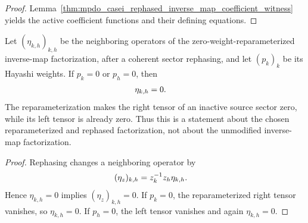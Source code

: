 \begin{proof}
    \leanok
    Lemma~\ref{thm:mpdo_casei_rephased_inverse_map_coefficient_witness}
    yields the active coefficient functions and their defining equations.
\end{proof}

\begin{lemma}
    \label{thm:mpdo_rephased_zero_weight_incident_vanish}
    \leanok
    Let $(\eta_{k,h})_{k,h}$ be the neighboring operators of the
    zero-weight-reparameterized inverse-map factorization, after a coherent
    sector rephasing, and let $(p_k)_k$ be its Hayashi weights. If
    $p_k=0$ or $p_h=0$, then
    \begin{align}
        \eta_{k,h} & =0.
        \notag
    \end{align}
    The reparameterization makes the right tensor of an inactive source sector
    zero, while its left tensor is already zero. Thus this is a statement about
    the chosen reparameterized and rephased factorization, not about the unmodified
    inverse-map factorization.
\end{lemma}

\begin{proof}
    \leanok
    Rephasing changes a neighboring operator by
    \begin{align}
        (\eta_z)_{k,h} & =z_k^{-1}z_h\eta_{k,h}.
        \notag
    \end{align}
    Hence \(\eta_{k,h}=0\) implies \((\eta_z)_{k,h}=0\). If \(p_k=0\),
    the reparameterized right tensor vanishes, so \(\eta_{k,h}=0\). If
    \(p_h=0\), the left tensor vanishes and again \(\eta_{k,h}=0\).
\end{proof}

